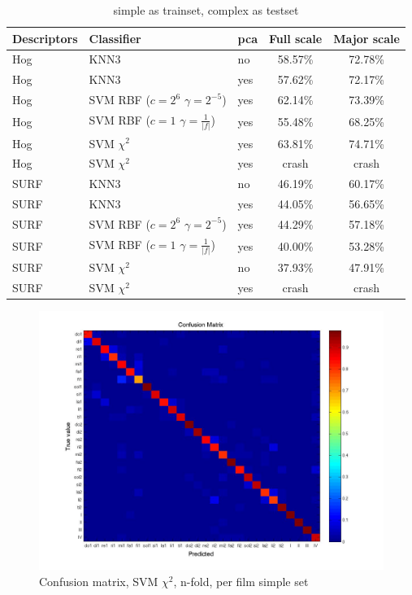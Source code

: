 \begin{table}
\centering
\begin{tabular}{lllcc}
\hline\hline
Descriptors & Classifier 		& pca		&  	Full scale	&	Major scale	\\
\hline
Hog & KNN3				& no	&	58.57\% 	&	72.78\%	\\
Hog & KNN3 				& yes	&	57.62\% 	&	72.17\%	\\
Hog & SVM RBF ($c=2^6$ $\gamma=2^{-5}$)			& yes & 62.14\%	&	73.39\%	\\
Hog & SVM RBF ($c=1$ $\gamma=\frac{1}{|f|}$)	& yes & 55.48\%	&	68.25\%	\\
Hog & SVM $\chi^2$ 		&	yes	&	63.81\%	&	74.71\%	\\
Hog & SVM $\chi^2$		&	yes &	crash 	&	crash \\
\hline
SURF & KNN3				&	no	&	46.19\% 	&	60.17\%	\\
SURF & KNN3										& yes &	44.05\% & 56.65\% \\
SURF & SVM RBF ($c=2^6$ $\gamma=2^{-5}$)		& yes &	44.29\%	&	57.18\%	\\
SURF & SVM RBF ($c=1$ $\gamma=\frac{1}{|f|}$)	& yes &	40.00\%	&	53.28\%	\\
SURF & SVM $\chi^2$								& no  &	37.93\%		&	47.91\%	\\
SURF & SVM $\chi^2$		&	yes	&	crash 	&	crash \\
\hline
\end{tabular}
\caption{simple as trainset, complex as testset}
\label{tab:perset}
\end{table}




\begin{figure}[htbp]
	\centering{}
	\includegraphics[width=\linewidth]{confmat/confusion.jpg}
	\caption{Confusion matrix, SVM $\chi^2$, n-fold, per film simple set}
	\label{fig:confusion}
\end{figure}




